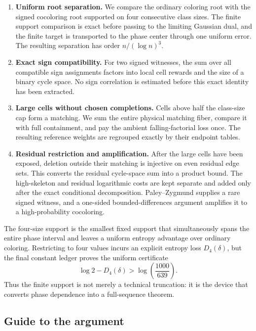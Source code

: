 \begin{enumerate}
\item \textbf{Uniform root separation.} We compare the ordinary coloring root
with the signed cocoloring root supported on four consecutive class sizes. The
finite support comparison is exact before passing to the limiting Gaussian
dual, and the finite target is transported to the phase center through one
uniform error. The resulting separation has order $n/(\log n)^3$.

\item \textbf{Exact sign compatibility.} For two signed witnesses, the sum over
all compatible sign assignments factors into local cell rewards and the size
of a binary cycle space. No sign correlation is estimated before this exact
identity has been extracted.

\item \textbf{Large cells without chosen completions.} Cells above half the
class-size cap form a matching. We sum the entire physical matching fiber,
compare it with full containment, and pay the ambient falling-factorial loss
once. The resulting reference weights are regrouped exactly by their endpoint
tables.

\item \textbf{Residual restriction and amplification.} After the large cells
have been exposed, deletion outside their matching is injective on even
residual edge sets. This converts the residual cycle-space sum into a product
bound. The high-skeleton and residual logarithmic costs are kept separate and
added only after the exact conditional decomposition. Paley--Zygmund supplies
a rare signed witness, and a one-sided bounded-differences argument amplifies
it to a high-probability cocoloring.
\end{enumerate}

The four-size support is the smallest fixed support that simultaneously spans
the entire phase interval and leaves a uniform entropy advantage over ordinary
coloring. Restricting to four values incurs an explicit entropy loss
$D_4(\delta)$, but the final constant ledger proves the uniform certificate
\[
  \log 2-D_4(\delta)
  >
  \log\!\left(\frac{1000}{639}\right).
\]
Thus the finite support is not merely a technical truncation: it is the device
that converts phase dependence into a full-sequence theorem.

\subsection*{Guide to the argument}

